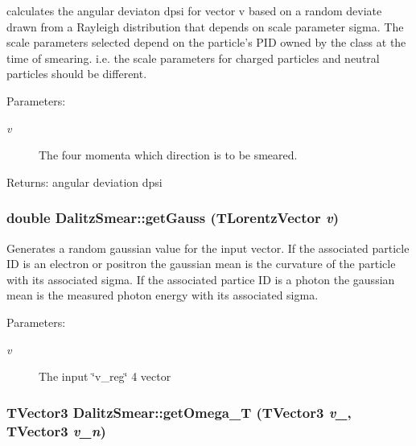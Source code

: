 calculates the angular deviaton dpsi for vector v based on a random deviate drawn from a Rayleigh distribution that depends on scale parameter sigma. The scale parameters selected depend on the particle's PID owned by the class at the time of smearing. i.e. the scale parameters for charged particles and neutral particles should be different. 

\begin{Desc}
\item[Parameters:]
\begin{description}
\item[{\em v}]The four momenta which direction is to be smeared. \end{description}
\end{Desc}
\begin{Desc}
\item[Returns:]angular deviation dpsi \end{Desc}
\subsubsection{\setlength{\rightskip}{0pt plus 5cm}double Dalitz\-Smear::get\-Gauss (TLorentz\-Vector {\em v})\hspace{0.3cm}{\tt  [private]}}\label{classDalitzSmear_18fa31b26891f1138adff5dea3a8f558}


Generates a random gaussian value for the input vector. If the associated particle ID is an electron or positron the gaussian mean is the curvature of the particle with its associated sigma. If the associated partice ID is a photon the gaussian mean is the measured photon energy with its associated sigma. 

\begin{Desc}
\item[Parameters:]
\begin{description}
\item[{\em v}]The input \char`\"{}v\_\-reg\char`\"{} 4 vector \end{description}
\end{Desc}
\subsubsection{\setlength{\rightskip}{0pt plus 5cm}TVector3 Dalitz\-Smear::get\-Omega\_\-T (TVector3 {\em v\_}, TVector3 {\em v\_\-n})\hspace{0.3cm}{\tt  [private]}}\label{classDalitzSmear_ba454a3cdff75924c7b2613813f1f111}


